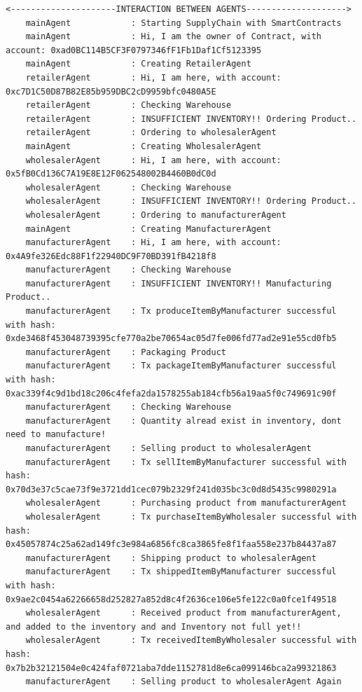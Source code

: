 \begin{itemize}
\begin{lstlisting}[numbers=none, basicstyle=\ttfamily\tiny]
    <---------------------INTERACTION BETWEEN AGENTS-------------------->
    mainAgent            : Starting SupplyChain with SmartContracts
    mainAgent            : Hi, I am the owner of Contract, with account: 0xad0BC114B5CF3F0797346fF1Fb1Daf1Cf5123395
    mainAgent            : Creating RetailerAgent
    retailerAgent        : Hi, I am here, with account: 0xc7D1C50D87B82E85b959DBC2cD9959bfc0480A5E
    retailerAgent        : Checking Warehouse
    retailerAgent        : INSUFFICIENT INVENTORY!! Ordering Product..
    retailerAgent        : Ordering to wholesalerAgent
    mainAgent            : Creating WholesalerAgent
    wholesalerAgent      : Hi, I am here, with account: 0x5fB0Cd136C7A19E8E12F062548002B4460B0dC0d
    wholesalerAgent      : Checking Warehouse
    wholesalerAgent      : INSUFFICIENT INVENTORY!! Ordering Product..
    wholesalerAgent      : Ordering to manufacturerAgent
    mainAgent            : Creating ManufacturerAgent
    manufacturerAgent    : Hi, I am here, with account: 0x4A9fe326Edc88F1f22940DC9F70BD391fB4218f8
    manufacturerAgent    : Checking Warehouse
    manufacturerAgent    : INSUFFICIENT INVENTORY!! Manufacturing Product..
    manufacturerAgent    : Tx produceItemByManufacturer successful with hash: 0xde3468f453048739395cfe770a2be70654ac05d7fe006fd77ad2e91e55cd0fb5
    manufacturerAgent    : Packaging Product
    manufacturerAgent    : Tx packageItemByManufacturer successful with hash: 0xac339f4c9d1bd18c206c4fefa2da1578255ab184cfb56a19aa5f0c749691c90f
    manufacturerAgent    : Checking Warehouse
    manufacturerAgent    : Quantity alread exist in inventory, dont need to manufacture!
    manufacturerAgent    : Selling product to wholesalerAgent
    manufacturerAgent    : Tx sellItemByManufacturer successful with hash: 0x70d3e37c5cae73f9e3721dd1cec079b2329f241d035bc3c0d8d5435c9980291a
    wholesalerAgent      : Purchasing product from manufacturerAgent
    wholesalerAgent      : Tx purchaseItemByWholesaler successful with hash: 0x45057874c25a62ad149fc3e984a6856fc8ca3865fe8f1faa558e237b84437a87
    manufacturerAgent    : Shipping product to wholesalerAgent
    manufacturerAgent    : Tx shippedItemByManufacturer successful with hash: 0x9ae2c0454a62266658d252827a852d8c4f2636ce106e5fe122c0a0fce1f49518
    wholesalerAgent      : Received product from manufacturerAgent, and added to the inventory and and Inventory not full yet!!
    wholesalerAgent      : Tx receivedItemByWholesaler successful with hash: 0x7b2b32121504e0c424faf0721aba7dde1152781d8e6ca099146bca2a99321863
    manufacturerAgent    : Selling product to wholesalerAgent Again

\end{lstlisting}
\end{itemize}
